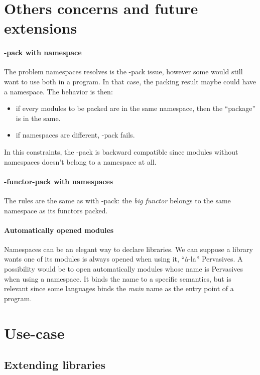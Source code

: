 \section{Others concerns and future extensions}

\paragraph{-pack with namespace}

The problem namespaces resolves is the -pack issue, however some would still
want to use both in a program. In that case, the packing result maybe could have
a namespace. The behavior is then:
\begin{itemize}
\item if every modules to be packed are in the same namespace, then the
  ``package'' is in the same.
\item if namespaces are different, -pack fails.
\end{itemize}

In this constraints, the -pack is backward compatible since modules without
namespaces doesn't belong to a namespace at all.

\paragraph{-functor-pack with namespaces}

The rules are the same as with -pack: the \emph{big functor} belongs to the same
namespace as its functors packed.

\paragraph{Automatically opened modules}

Namespaces can be an elegant way to declare libraries. We can suppose a library
wants one of its modules is always opened when using it, ``à-la''
Pervasives. A possibility would be to open automatically modules whose name is
Pervasives when using a namespace. It binds the name to a specific semantics,
but is relevant since some languages binds the \emph{main} name as the entry
point of a program.

\section{Use-case}


\subsection{Extending libraries}

